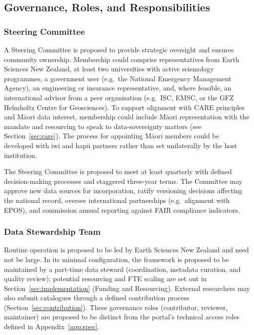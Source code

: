 \documentclass[11pt]{article}
\begin{document}
\subsection{Governance, Roles, and Responsibilities}
\subsubsection{Steering Committee}
\label{sec:steering}
A Steering Committee is proposed to provide strategic oversight and ensures community ownership. Membership could comprise representatives from Earth Sciences New Zealand, at least two universities with active seismology programmes, a government user (e.g.\ the National Emergency Management Agency), an engineering or insurance representative, and, where feasible, an international advisor from a peer organisation (e.g.\ ISC, EMSC, or the GFZ Helmholtz Centre for Geosciences). To support alignment with CARE principles and M\=aori data interest, membership could include M\=aori representation with the mandate and resourcing to speak to data-sovereignty matters (see Section~\ref{sec:care}). The process for appointing M\=aori members could be developed with iwi and hap\=u partners rather than set unilaterally by the host institution. 

The Steering Committee is proposed to meet at least quarterly with defined decision-making processes and staggered three-year terms. The Committee may approve new data sources for incorporation, ratify versioning decisions affecting the national record, oversee international partnerships (e.g.\ alignment with EPOS), and commission annual reporting against FAIR compliance indicators.

\subsubsection{Data Stewardship Team}
\label{sec:steward}
Routine operation is proposed to be led by Earth Sciences New Zealand and need not be large. In its minimal configuration, the framework is proposed to be maintained by a part-time data steward (coordination, metadata curation, and quality review); potential resourcing and FTE scaling are set out in Section~\ref{sec:implementation} (Funding and Resourcing). External researchers may also submit catalogues through a defined contribution process (Section~\ref{sec:contribution}). These governance roles (contributor, reviewer, maintainer) are proposed to be distinct from the portal's technical access roles defined in Appendix~\ref{app:spec}.
\end{document}
